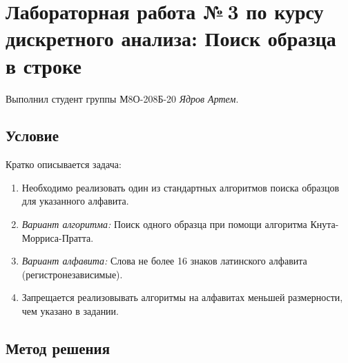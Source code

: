\documentclass[12pt]{article}
\begin{document}
	
	\section*{Лабораторная работа №\,3 по курсу дискретного анализа: Поиск образца в строке}
	
	Выполнил студент группы М8О-208Б-20 \textit{Ядров Артем}.
	
	\subsection*{Условие}
	
	Кратко описывается задача: 
	\begin{enumerate}
		\item Необходимо реализовать один из стандартных алгоритмов поиска образцов для указанного алфавита.
		\item \textit{Вариант алгоритма:} Поиск одного образца при помощи алгоритма Кнута-Морриса-Пратта.
		\item \textit{Вариант алфавита:} Слова не более 16 знаков латинского алфавита (регистронезависимые).
		\item Запрещается реализовывать алгоритмы на алфавитах меньшей размерности, чем указано в задании. 
	\end{enumerate}
	
	\subsection*{Метод решения}
	
\end{document}
